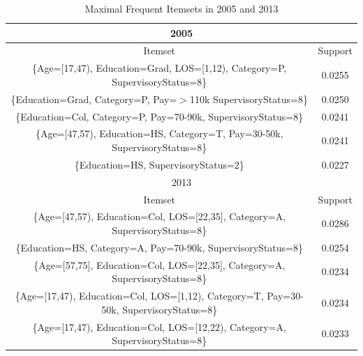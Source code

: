 \documentclass{article}
\begin{document}
    \begin{center}
        \begin{table}
            \centering
            \begin{tabular}{ |c|c| }
                \hline
                \multicolumn{2}{|c|}{2005} \\
                \hline
                Itemset & Support \\
                \hline
                \{Age=[17,47),
                Education=Grad,
                LOS=[1,12),
                Category=P,
                SupervisoryStatus=8\} & 0.0255 \\
                \{Education=Grad,
                Category=P,
                Pay=$>$110k
                SupervisoryStatus=8\} & 0.0250 \\
                \{Education=Col,
                Category=P,
                Pay=70-90k,
                SupervisoryStatus=8\} & 0.0241 \\
                \{Age=[47,57),
                Education=HS,
                Category=T,
                Pay=30-50k,
                SupervisoryStatus=8\} & 0.0241 \\
                \{Education=HS,
                SupervisoryStatus=2\} & 0.0227 \\
                \hline
                \multicolumn{2}{|c|}{2013} \\
                \hline
                Itemset & Support \\
                \hline
                \{Age=[47,57),
                Education=Col,
                LOS=[22,35],
                Category=A,
                SupervisoryStatus=8\} & 0.0286 \\
                \{Education=HS,
                Category=A,
                Pay=70-90k,
                SupervisoryStatus=8\} & 0.0254 \\
                \{Age=[57,75],
                Education=Col,
                LOS=[22,35],
                Category=A,
                SupervisoryStatus=8\} & 0.0234 \\
                \{Age=[17,47),
                Education=Col,
                LOS=[1,12),
                Category=T,
                Pay=30-50k,
                SupervisoryStatus=8\} & 0.0234 \\
                \{Age=[17,47),
                Education=Col,
                LOS=[12,22),
                Category=A,
                SupervisoryStatus=8\} & 0.0233 \\
                \hline
            \end{tabular}
            \caption{Maximal Frequent Itemsets in 2005 and 2013}
            \label{tab:7}
        \end{table}
    \end{center}
\end{document}
